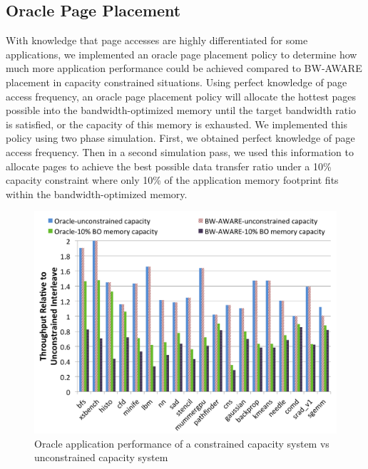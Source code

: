\subsection{Oracle Page Placement}
With knowledge that page accesses are highly differentiated for some applications, we implemented
an oracle page placement policy to determine how much more application performance could be achieved
compared to BW-AWARE placement in capacity constrained situations.  {\color{black}Using perfect knowledge of page
access frequency, an oracle page placement policy will allocate the hottest pages possible into the
bandwidth-optimized memory until the target bandwidth ratio is satisfied, or the capacity of this memory
is exhausted.}  We implemented this policy using two phase simulation. First, we obtained perfect
knowledge of page access frequency. Then in a second simulation pass, we used this information to allocate
pages to achieve the best possible data transfer ratio under a 10\% capacity constraint where only
10\% of the application memory footprint fits within the bandwidth-optimized memory.

\begin{figure}[t]
    \includegraphics[width=\columnwidth]{asplos2015/figures/oracle-perf.png} 
    \caption{Oracle application performance of a constrained capacity system vs
unconstrained capacity system}
    \label{fig:oracleperf}
\end{figure}

